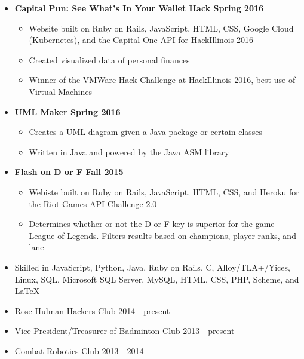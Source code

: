 \documentclass[10pt]{article} %
\begin{document}
\begin{itemize}
	\item[] \textbf{Capital Pun: See What's In Your Wallet Hack \hfill \textmd{Spring 2016}}
	\begin{itemize}
		\item  Website built on Ruby on Rails, JavaScript, HTML, CSS, Google Cloud (Kubernetes), and the Capital One API for HackIllinois 2016
		\item Created visualized data of personal finances
		\item Winner of the VMWare Hack Challenge at HackIllinois 2016, best use of Virtual Machines
	\end{itemize}
	\item[] \textbf{UML Maker \hfill \textmd{Spring 2016}}
	\begin{itemize}
		\item Creates a UML diagram given a Java package or certain classes
		\item Written in Java and powered by the Java ASM library
	\end{itemize}
	\item[] \textbf{Flash on D or F \hfill \textmd{Fall 2015}}
	\begin{itemize}
		\item Webiste built on Ruby on Rails, JavaScript, HTML, CSS, and Heroku for the Riot Games API Challenge 2.0
		\item Determines whether or not the D or F key is superior for the game League of Legends. Filters results based on champions, player ranks, and lane
	\end{itemize}
\end{itemize}
\begin{itemize}
	\item[]  Skilled in JavaScript, Python, Java, Ruby on Rails, C, Alloy/TLA+/Yices, Linux, SQL, Microsoft SQL Server, MySQL, HTML, CSS, PHP, Scheme, and \LaTeX
\end{itemize}
\begin{itemize}
	\item[] Rose-Hulman Hackers Club \hfill 2014 - present
	\item[] Vice-President/Treasurer of Badminton Club \hfill 2013 - present
	\item[] Combat Robotics Club \hfill 2013 - 2014
\end{itemize}
\
\end{document}
